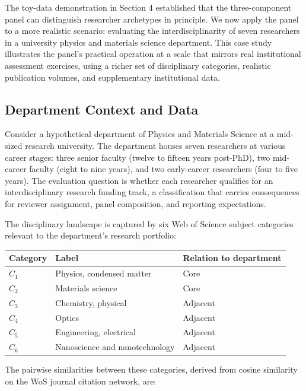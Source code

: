\documentclass[
]{article}
\begin{document}
The toy-data demonstration in Section 4 established that the
three-component panel can distinguish researcher archetypes in
principle. We now apply the panel to a more realistic scenario:
evaluating the interdisciplinarity of seven researchers in a university
physics and materials science department. This case study illustrates
the panel's practical operation at a scale that mirrors real
institutional assessment exercises, using a richer set of disciplinary
categories, realistic publication volumes, and supplementary
institutional data.

\hypertarget{department-context-and-data}{%
\subsection{Department Context and
Data}\label{department-context-and-data}}

Consider a hypothetical department of Physics and Materials Science at a
mid-sized research university. The department houses seven researchers
at various career stages: three senior faculty (twelve to fifteen years
post-PhD), two mid-career faculty (eight to nine years), and two
early-career researchers (four to five years). The evaluation question
is whether each researcher qualifies for an interdisciplinary research
funding track, a classification that carries consequences for reviewer
assignment, panel composition, and reporting expectations.

The disciplinary landscape is captured by six Web of Science subject
categories relevant to the department's research portfolio:

\begin{longtable}[]{@{}lll@{}}
\toprule
Category & Label & Relation to department \\
\midrule
\endhead
\(C_1\) & Physics, condensed matter & Core \\
\(C_2\) & Materials science & Core \\
\(C_3\) & Chemistry, physical & Adjacent \\
\(C_4\) & Optics & Adjacent \\
\(C_5\) & Engineering, electrical & Adjacent \\
\(C_6\) & Nanoscience and nanotechnology & Adjacent \\
\bottomrule
\end{longtable}

The pairwise similarities between these categories, derived from cosine
similarity on the WoS journal citation network, are:
\end{document}
